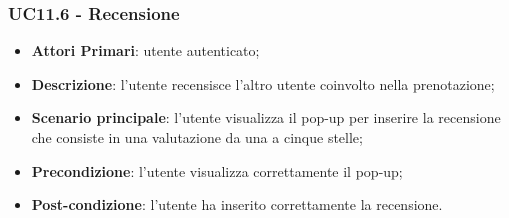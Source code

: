 \subsubsection{UC11.6 - Recensione}
\begin{itemize}
	\item \textbf{Attori Primari}: utente autenticato;
	\item \textbf{Descrizione}: l'utente recensisce l'altro utente coinvolto nella prenotazione;
	\item \textbf{Scenario principale}: l'utente visualizza il pop-up per inserire la recensione che consiste in una valutazione da una a cinque stelle;
	\item \textbf{Precondizione}: l'utente visualizza correttamente il pop-up;
	\item \textbf{Post-condizione}: l'utente ha inserito correttamente la recensione.
\end{itemize}

